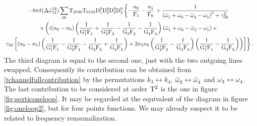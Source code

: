 \begin{multline}
    -8\pi\delta(\Delta{\tilde{\omega}}^{34}_{12})\sum_{56}\mathrm{T}_{2546}\mathrm{T}_{6135}\mathrm{D}_1^0\mathrm{D}_2^0\mathrm{D}_3^0\mathrm{D}_4^0 \left\{ -\frac{n_6}{\mathrm{F}_5}-\frac{n_5}{\mathrm{F}_6}\right. +
    \frac{1}{\left( \tilde{\omega}^{}_1 + \omega^{}_6 - \tilde{\omega}^{}_3 - \omega^{}_5\right)^2 + \gamma^2_{56}}\\
    \times \left(
    i(n_6-n_5)\left(\dfrac{1}{\mathrm{G}_1^*\mathrm{F}_1^{}}+\dfrac{1}{\mathrm{G}_2^*\mathrm{F}_2^{}}-\dfrac{1}{\mathrm{G}_3^{}\mathrm{F}_3^{}}
    -\dfrac{1}{\mathrm{G}_4^{}\mathrm{F}_4^{}}\right)\left(\tilde{\omega}^{}_1 + \omega^{}_6 - \tilde{\omega}^{}_3 - \omega^{}_5\right) + 
    \right.\\
    \left.\left.
    \gamma_{56}\left[(n_6-n_5 )\left(\dfrac{1}{\mathrm{G}_1^*\mathrm{F}_1^{}}-\dfrac{1}{\mathrm{G}_2^*\mathrm{F}_2^{}}-\dfrac{1}{\mathrm{G}_3^{}\mathrm{F}_3^{}}
    +\dfrac{1}{\mathrm{G}_4^{}\mathrm{F}_4^{}}\right) + 2n_5n_6 \left(\dfrac{1}{\mathrm{G}_2^*\mathrm{F}_2^{}}-\dfrac{1}{\mathrm{G}_4^{}\mathrm{F}_4^{}}\right)\left(\dfrac{1}{\mathrm{G}_1^*\mathrm{F}_1^{}}-\dfrac{1}{\mathrm{G}_3^{}\mathrm{F}_3^{}}
    \right)\right)
    \right]\right\}.
    \label{tchannelfullcontribution}
\end{multline}    
The third diagram is equal to the second one, just with the two outgoing lines swapped. Consequently its contribution can be obtained from 
\eqref{tchannelfullcontribution} by the permutations $k_3 \leftrightarrow k_4$, $\tilde{\omega}^{}_3 \leftrightarrow\tilde{\omega}^{}_4$ and $\omega^{}_3 \leftrightarrow\omega^{}_4$.\\

The last contribution to be considered at order $\mathrm{T}^2$ is the one in figure \ref{fig:sexticoneloop}. It may be regarded at the equivalent of the diagram in figure 
\ref{fig:oneloop2}, but for four points functions. We may already suspect it to be related to frequency renormalization.\\

